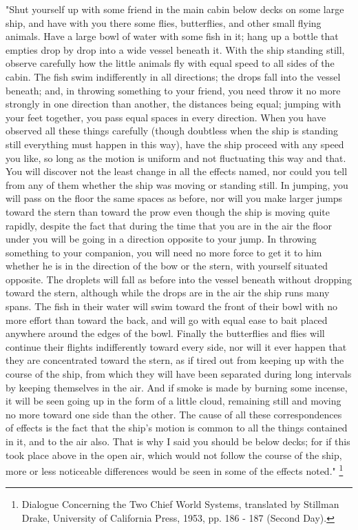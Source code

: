 \documentclass[11pt]{article}
\begin{document}
"Shut yourself up with some friend in the main cabin below decks on some large ship, and have with you there some flies, butterflies, and other small flying animals. Have a large bowl of water with some fish in it; hang up a bottle that empties drop by drop into a wide vessel beneath it. With the ship standing still, observe carefully how the little animals fly with equal speed to all sides of the cabin. The fish swim indifferently in all directions; the drops fall into the vessel beneath; and, in throwing something to your friend, you need throw it no more strongly in one direction than another, the distances being equal; jumping with your feet together, you pass equal spaces in every direction. When you have observed all these things carefully (though doubtless when the ship is standing still everything must happen in this way), have the ship proceed with any speed you like, so long as the motion is uniform and not fluctuating this way and that. You will discover not the least change in all the effects named, nor could you tell from any of them whether the ship was moving or standing still. In jumping, you will pass on the floor the same spaces as before, nor will you make larger jumps toward the stern than toward the prow even though the ship is moving quite rapidly, despite the fact that during the time that you are in the air the floor under you will be going in a direction opposite to your jump. In throwing something to your companion, you will need no more force to get it to him whether he is in the direction of the bow or the stern, with yourself situated opposite. The droplets will fall as before into the vessel beneath without dropping toward the stern, although while the drops are in the air the ship runs many spans. The fish in their water will swim toward the front of their bowl with no more effort than toward the back, and will go with equal ease to bait placed anywhere around the edges of the bowl. Finally the butterflies and flies will continue their flights indifferently toward every side, nor will it ever happen that they are concentrated toward the stern, as if tired out from keeping up with the course of the ship, from which they will have been separated during long intervals by keeping themselves in the air. And if smoke is made by burning some incense, it will be seen going up in the form of a little cloud, remaining still and moving no more toward one side than the other. The cause of all these correspondences of effects is the fact that the ship's motion is common to all the things contained in it, and to the air also. That is why I said you should be below decks; for if this took place above in the open air, which would not follow the course of the ship, more or less noticeable differences would be seen in some of the effects noted."
\footnote{Dialogue Concerning the Two Chief World Systems, translated by Stillman Drake, University of California Press, 1953, pp. 186 - 187 (Second Day).}
\end{document}
